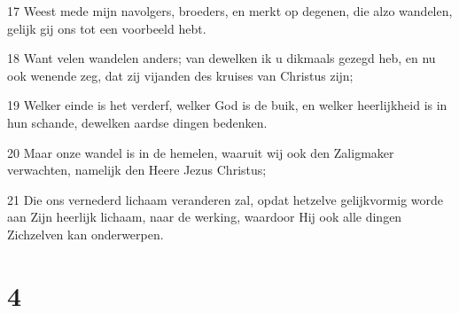 \par 17 Weest mede mijn navolgers, broeders, en merkt op degenen, die alzo wandelen, gelijk gij ons tot een voorbeeld hebt.
\par 18 Want velen wandelen anders; van dewelken ik u dikmaals gezegd heb, en nu ook wenende zeg, dat zij vijanden des kruises van Christus zijn;
\par 19 Welker einde is het verderf, welker God is de buik, en welker heerlijkheid is in hun schande, dewelken aardse dingen bedenken.
\par 20 Maar onze wandel is in de hemelen, waaruit wij ook den Zaligmaker verwachten, namelijk den Heere Jezus Christus;
\par 21 Die ons vernederd lichaam veranderen zal, opdat hetzelve gelijkvormig worde aan Zijn heerlijk lichaam, naar de werking, waardoor Hij ook alle dingen Zichzelven kan onderwerpen.

\chapter{4}

